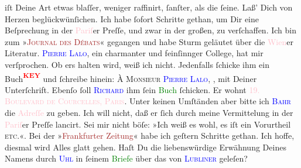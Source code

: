                iſt Deine Art etwas blaſſer, weniger raffinirt, ſanſter, als die ſeine. Laß’ Dich von
               Herzen beglückwünſichen.\pend
           \pstart
           Ich habe ſofort Schritte gethan, um Dir eine Beſprechung in der \textcolor{pink}{Pariſ}{}\ledrightnote{\textcolor{pink}{Paris}}er Preſſe, und zwar in der großen, zu verſchaffen. Ich bin
               zum »\textsc{\textcolor{brown}{Journal des Débats}{}\ledrightnote{\textcolor{brown}{Journal des débats}}}«
               gegangen und habe Sturm geläutet über die \textcolor{pink}{Wien}{}\ledrightnote{\textcolor{pink}{Wien}}er
               Literatur. \textsc{\textcolor{blue}{Pierre Lalo}{}\ledrightnote{\textcolor{blue}{Pierre Lalo}}},
               ein charmanter und feinſinnger College, hat mir \label{K_L02622-1v}\label{K_L02622-1h} verſprochen. Ob ers halten {\pb}wird,
               weiß ich nicht. Jedenfalls ſchicke ihm ein Buch\textcolor{red}{\textsuperscript{\textbf{KEY}}} und
               ſchreibe hinein: \textsc{À Monsieur \textcolor{blue}{Pierre
                     Lalo}{}\ledrightnote{\textcolor{blue}{Pierre Lalo}}}, \textsc{\label{K_mets_Goldmann_94-partII-676v}\label{K_mets_Goldmann_94-partII-676h}}, mit Deiner Unterſchrift. Ebenſo ſoll \textsc{\textcolor{blue}{Richard}{}\ledrightnote{\textcolor{blue}{Richard Beer-Hofmann}}} ihm ſein \textcolor{green}{Buch}{} ſchicken. Er wohnt \textsc{\textcolor{pink}{19. Boulevard de Courcelles,
                     Paris}{}\ledrightnote{\textcolor{pink}{Boulevard de Courcelles}}}. Unter keinen Umſtänden aber bitte ich \textsc{\textcolor{blue}{Bahr}{}\ledrightnote{\textcolor{blue}{Hermann Bahr}}} die \textcolor{pink}{Adreſſe}{} zu geben. Ich will nicht, daß er ſich durch meine
               Vermittelung in der \textcolor{pink}{Pariſ}{}\ledrightnote{\textcolor{pink}{Paris}}er Preſſe lancirt. Sei mir
               nicht böſe: »Ich weiß es wohl, es iſt ein Vorurtheil \textsc{etc.}«.\pend
           \pstart
           {\pb}Bei der »\textcolor{brown}{Frankfurter
                  Zeitung}{}\ledrightnote{\textcolor{brown}{Frankfurter Zeitung}}« habe ich geſtern Schritte gethan. Ich hoffe, diesmal wird Alles
               glatt gehen. Haſt Du die liebenswürdige Erwähnung Deines Namens durch \textsc{\textcolor{blue}{Uhl}{}\ledrightnote{\textcolor{blue}{Friedrich Uhl}}} in ſeinem \textcolor{green}{Briefe}{} über das \label{K_L02622-55v}\label{K_L02622-55h} von \textsc{\textcolor{blue}{Lubliner}{}\ledrightnote{\textcolor{blue}{Hugo Lubliner}}} geleſen?\pend
